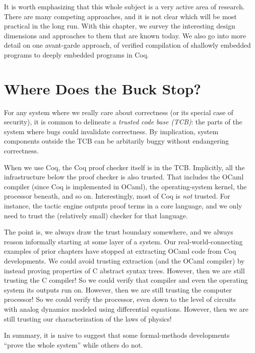 \documentclass{amsbook}
\theoremstyle{definition}
\theoremstyle{remark}
\numberwithin{section}{chapter}
\numberwithin{equation}{chapter}
\begin{document}
It is worth emphasizing that this whole subject is a very active area of research.
There are many competing approaches, and it is not clear which will be most practical in the long run.
With this chapter, we survey the interesting design dimensions and approaches to them that are known today.
We also go into more detail on one avant-garde approach, of verified compilation of shallowly embedded programs to deeply embedded programs in Coq.

\section{Where Does the Buck Stop?}

For any system where we really care about correctness (or its special case of security), it is common to delineate a \emph{trusted code base (TCB)}: the parts of the system where bugs could invalidate correctness.
By implication, system components outside the TCB can be arbitarily buggy without endangering correctness.

When we use Coq, the Coq proof checker itself is in the TCB.
Implicitly, all the infrastructure below the proof checker is also trusted.
That includes the OCaml compiler (since Coq is implemented in OCaml), the operating-system kernel, the processor beneath, and so on.
Interestingly, most of Coq is \emph{not} trusted.
For instance, the tactic engine outputs proof terms in a core language, and we only need to trust the (relatively small) checker for that language.

The point is, we always draw the trust boundary somewhere, and we always reason informally starting at some layer of a system.
Our real-world-connecting examples of prior chapters have stopped at extracting OCaml code from Coq developments.
We could avoid trusting extraction (and the OCaml compiler) by instead proving properties of C abstract syntax trees.
However, then we are still trusting the C compiler!
So we could verify that compiler and even the operating system its outputs run on.
However, then we are still trusting the computer processor!
So we could verify the processor, even down to the level of circuits with analog dynamics modeled using differential equations.
However, then we are still trusting our characterization of the laws of physics!

In summary, it is naive to suggest that some formal-methods developments ``prove the whole system'' while others do not.
\end{document}
